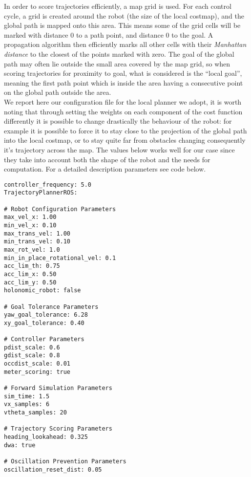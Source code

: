 In order to score trajectories efficiently, a map grid is used. For each
control cycle, a grid is created around the robot (the size of the local costmap),
and the global path is mapped onto this area. This means some of the grid
cells will be marked with distance 0 to a path point, and distance 0 to the
goal. A propagation algorithm then efficiently marks all other cells with their
\textit{Manhattan distance} to the closest of the points marked with zero. The goal
of the global path may often lie outside the small area covered by the map
grid, so when scoring trajectories for proximity to goal, what is considered is
the “local goal”, meaning the first path point which is inside the area having
a consecutive point on the global path outside the area.
\\
We report here our configuration file for the local planner we adopt, it is
worth noting that through setting the weights on each component of the cost
function differently it is possible to change drastically the behaviour of the
robot: for example it is possible to force it to stay close to the projection of
the global path into the local costmap, or to stay quite far from obstacles
changing consequently it’s trajectory across the map. The values below works
well for our case since they take into account both the shape of the robot
and the needs for computation. For a detailed description parameters see code below.
\begin{lstlisting}
controller_frequency: 5.0
TrajectoryPlannerROS:

# Robot Configuration Parameters
max_vel_x: 1.00
min_vel_x: 0.10
max_trans_vel: 1.00
min_trans_vel: 0.10
max_rot_vel: 1.0
min_in_place_rotational_vel: 0.1
acc_lim_th: 0.75
acc_lim_x: 0.50
acc_lim_y: 0.50
holonomic_robot: false

# Goal Tolerance Parameters
yaw_goal_tolerance: 6.28
xy_goal_tolerance: 0.40

# Controller Parameters 
pdist_scale: 0.6
gdist_scale: 0.8
occdist_scale: 0.01 
meter_scoring: true

# Forward Simulation Parameters
sim_time: 1.5
vx_samples: 6
vtheta_samples: 20

# Trajectory Scoring Parameters
heading_lookahead: 0.325
dwa: true

# Oscillation Prevention Parameters
oscillation_reset_dist: 0.05
\end{lstlisting}

